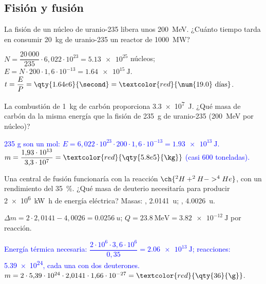 \subsection{Fisión y fusión}

\begin{exercise}
    La fisión de un núcleo de uranio-235 libera unos \qty{200}{\mega\electronvolt}. ¿Cuánto tiempo tarda en consumir \qty{20}{\kg} de uranio-235 un
    reactor de \qty{1000}{\mega\watt}?
    \begin{solu}
        \(N = \dfrac{20\,000}{235}\cdot 6{,}022\cdot 10^{23} = \num{5.13e25}\) núcleos; \(E = N\cdot 200\cdot 1{,}6\cdot 10^{-13} = \qty{1.64e15}{\joule}\).
        \(t = \dfrac{E}{P} = \qty{1.64e6}{\second} = \textcolor{red}{\num{19.0}\ \text{días}}\).
    \end{solu}
\end{exercise}

\begin{exercise}
    La combustión de \qty{1}{\kg} de carbón proporciona \qty{3.3e7}{\joule}. ¿Qué masa de carbón da la misma energía que la fisión de
    \qty{235}{\g} de uranio-235 (\qty{200}{\mega\electronvolt} por núcleo)?
    \begin{solu}
        \textcolor{blue}{235 g son un mol: \(E = 6{,}022\cdot 10^{23}\cdot 200\cdot 1{,}6\cdot 10^{-13} = \qty{1.93e13}{\joule}\).}
        \(m = \dfrac{1{,}93\cdot 10^{13}}{3{,}3\cdot 10^7} = \textcolor{red}{\qty{5.8e5}{\kg}}\) \textcolor{blue}{(casi 600 toneladas).}
    \end{solu}
\end{exercise}

\begin{exercise}
    Una central de fusión funcionaría con la reacción \(\ch{^2H + ^2H -> ^4He}\), con un rendimiento del \qty{35}{\percent}. ¿Qué masa de deuterio
    necesitaría para producir \qty{2e6}{\kilo\watt\hour} de energía eléctrica? Masas: , \qty{2.0141}{u}; , \qty{4.0026}{u}.
    \begin{solu}
        \(\Delta m = 2\cdot 2{,}0141 - 4{,}0026 = \qty{0.0256}{u}\); \(Q = \qty{23.8}{\mega\electronvolt} = \qty{3.82e-12}{\joule}\) por reacción.

        \textcolor{blue}{Energía térmica necesaria: \(\dfrac{2\cdot 10^6\cdot 3{,}6\cdot 10^6}{0{,}35} = \qty{2.06e13}{\joule}\); reacciones: \num{5.39e24}, cada una con dos deuterones.}
        \(m = 2\cdot 5{,}39\cdot 10^{24}\cdot 2{,}0141\cdot 1{,}66\cdot 10^{-27} = \textcolor{red}{\qty{36}{\g}}\).
    \end{solu}
\end{exercise}
